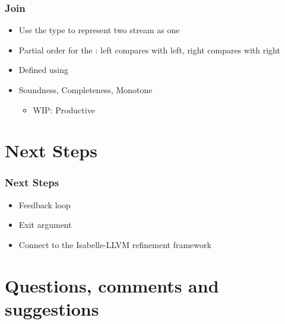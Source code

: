 \documentclass[aspectratio=169,10pt]{beamer}
\begin{document}
\begin{frame}[fragile]
  \frametitle{Join}
  \begin{itemize}
    \item Use the  type to represent two stream as one
    \item Partial order for the : left compares with left, right compares with right
    \item Defined using 
    \item Soundness, Completeness, Monotone
          \begin{itemize}
            \item WIP: Productive
          \end{itemize}
  \end{itemize}
\end{frame}

\section{Next Steps}

\begin{frame}
  \frametitle{Next Steps}
  \begin{itemize}
    \item Feedback loop
    \item Exit argument
    \item Connect to the Isabelle-LLVM refinement framework
  \end{itemize}
\end{frame}

\section{Questions, comments and suggestions}
\end{document}
